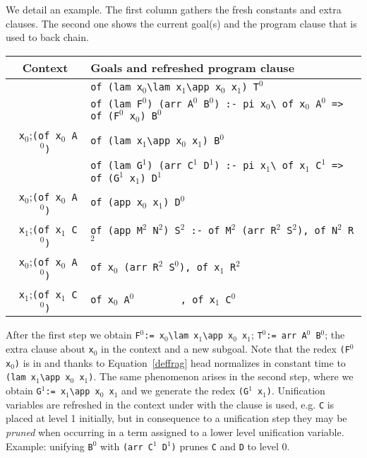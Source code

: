 \documentclass{llncs}
\begin{document}
We detail an example.
The first column gathers the fresh constants and extra clauses. The
second one shows the current goal(s) and the program clause that is
used to back chain.

\begin{center}
\small
\begin{tabular}{c|l}
Context & Goals and refreshed program clause \\\hline
& \verb+of (lam x+$_0$\verb+\lam x+$_1$\verb+\app x+$_0$\verb+ x+$_1$\verb+) T+$^0$  \\
& \verb+of (lam F+$^0$\verb+) (arr A+$^0$\verb+ B+$^0$\verb+) :- pi x+$_0$\verb+\ of x+$_0$\verb+ A+$^0$\verb+ => of (F+$^0$\verb+ x+$_0$\verb+) B+$^0$ \\\hline
\verb+ x+$_0$;\verb+(of x+$_0$\verb+ A+$^0$\verb+)+ & \verb+of (lam x+$_1$\verb+\app x+$_0$\verb+ x+$_1$\verb+) B+$^0$  \\
& \verb+of (lam G+$^1$\verb+) (arr C+$^1$\verb+ D+$^1$\verb+) :- pi x+$_1$\verb+\ of x+$_1$\verb+ C+$^1$\verb+ => of (G+$^1$\verb+ x+$_1$\verb+) D+$^1$\verb++  \\\hline
\verb+ x+$_0$;\verb+(of x+$_0$\verb+ A+$^0$\verb+)+ & \verb+of (app x+$_0$\verb+ x+$_1$\verb+) D+$^0$  \\
\verb+ x+$_1$;\verb+(of x+$_1$\verb+ C+$^0$\verb+)+ & \verb+of (app M+$^2$\verb+ N+$^2$\verb+) S+$^2$\verb+ :- of M+$^2$\verb+ (arr R+$^2$\verb+ S+$^2$\verb+), of N+$^2$\verb+ R+$^2$  \\\hline
\verb+ x+$_0$;\verb+(of x+$_0$\verb+ A+$^0$\verb+)+ & \verb+of x+$_0$\verb+ (arr R+$^2$\verb+ S+$^0$\verb+), of x+$_1$\verb+ R+$^2$  \\
\verb+ x+$_1$;\verb+(of x+$_1$\verb+ C+$^0$\verb+)+ & \verb+of x+$_0$\verb+ A+$^0$\hspace{4pt}\verb+        , of x+$_1$\verb+ C+$^0$ \\\hline
\end{tabular}
\end{center}

After the first step we obtain
\verb+F+$^0$\verb+:= x+$_0$\verb+\lam x+$_1$\verb+\app x+$_0$\verb+ x+$_1$;
\verb+T+$^0$\verb+:= arr A+$^0$\verb+ B+$^0$; the extra clause
about \verb+x+$_0$ in the context and a new subgoal.
Note that the redex \verb+(F+$^0$\verb+ x+$_0$\verb+)+ is in \rff{} and
thanks to Equation~\ref{deffrag} head normalizes in constant time
to \verb+(lam x+$_1$\verb+\app x+$_0$\verb+ x+$_1$\verb+)+.
The same phenomenon arises in the second step,
where we obtain \verb+G+$^1$\verb+:= x+$_1$\verb+\app x+$_0$\verb+ x+$_1$
and we generate the redex \verb+(G+$^1$\verb+ x+$_1$\verb+)+.
Unification variables are refreshed in the context under with
the clause is used, e.g. \verb+C+ is placed at level 1 initially,
but in consequence to a unification step they may be \emph{pruned}
when occurring in a term assigned to a lower level unification
variable. Example:  unifying 
\verb+B+$^0$ with \verb+(arr C+$^1$\verb+ D+$^1$\verb+)+ prunes
\verb+C+ and \verb+D+ to level 0.
\end{document}
